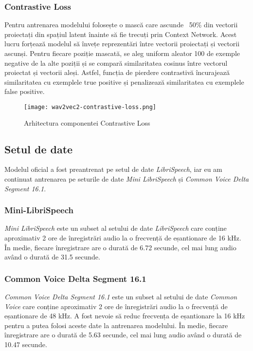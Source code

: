 \subsubsection{Contrastive Loss}
Pentru antrenarea modelului folosește o mască care ascunde ~50\% din vectorii proiectați din spațiul
latent înainte să fie trecuți prin Context Network. Acest lucru forțează modelul să învețe
reprezentări între vectorii proiectați și vectorii ascunși. Pentru fiecare poziție mascată, se
aleg uniform aleator 100 de exemple negative de la alte poziții și se compară similaritatea cosinus
între vectorul proiectat și vectorii aleși. Astfel, funcția de pierdere contrastivă încurajează
similaritatea cu exemplele true positive și penalizează similaritatea cu exemplele false positive.

\begin{figure}[h]
    \centering 
    \texttt{[image: wav2vec2-contrastive-loss.png]}
    \caption{Arhitectura componentei Contrastive Loss \protect\footnotemark[1]}
    \label{fig:wav2vec2-contrastive-loss}
\end{figure}


\subsection{Setul de date}
Modelul oficial a fost preantrenat pe setul de date \textit{LibriSpeech}, iar eu am continuat
antrenarea pe seturile de date \textit{Mini LibriSpeech} și \textit{Common Voice Delta Segment 16.1}.

\subsubsection{Mini-LibriSpeech}
\textit{Mini LibriSpeech} este un subset al setului de date \textit{LibriSpeech} care conține 
aproximativ 2 ore de înregistrări audio la o frecvență de eșantionare de 16 kHz. În medie,
fiecare înregistrare are o durată de 6.72 secunde, cel mai lung audio având o durată de 31.5 secunde.

\subsubsection{Common Voice Delta Segment 16.1}
\textit{Common Voice Delta Segment 16.1} este un subset al setului de date \textit{Common Voice}
care conține aproximativ 2 ore de înregistrări audio la o frecvență de eșantionare de 48 kHz.
A fost nevoie să reduc frecvența de eșantionare la 16 kHz pentru a putea folosi aceste date la
antrenarea modelului. În medie, fiecare înregistrare are o durată de 5.63 secunde, cel mai lung
audio având o durată de 10.47 secunde.

